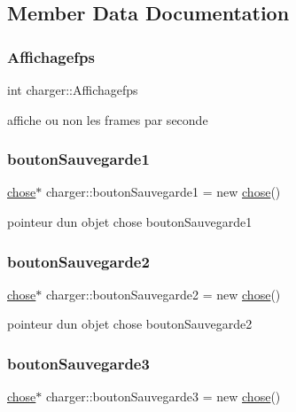 \subsection{Member Data Documentation}
\mbox{\label{classcharger_ad6193b2bdf5b389a40406961cd59090f}} 
\subsubsection{\texorpdfstring{Affichagefps}{Affichagefps}}
{\footnotesize\ttfamily int charger\+::\+Affichagefps}

affiche ou non les frames par seconde \mbox{\label{classcharger_af6c0ada98ee21a7ef16d3ff8aa9d35d6}} 
\subsubsection{\texorpdfstring{bouton\+Sauvegarde1}{boutonSauvegarde1}}
{\footnotesize\ttfamily \mbox{\hyperlink{classchose}{chose}}$\ast$ charger\+::bouton\+Sauvegarde1 = new \mbox{\hyperlink{classchose}{chose}}()}

pointeur d\textquotesingle{}un objet chose bouton\+Sauvegarde1 \mbox{\label{classcharger_a4e0387e8d34801e59fc10eb9063f0379}} 
\subsubsection{\texorpdfstring{bouton\+Sauvegarde2}{boutonSauvegarde2}}
{\footnotesize\ttfamily \mbox{\hyperlink{classchose}{chose}}$\ast$ charger\+::bouton\+Sauvegarde2 = new \mbox{\hyperlink{classchose}{chose}}()}

pointeur d\textquotesingle{}un objet chose bouton\+Sauvegarde2 \mbox{\label{classcharger_a8ac0d4c842e02190e452892932107887}} 
\subsubsection{\texorpdfstring{bouton\+Sauvegarde3}{boutonSauvegarde3}}
{\footnotesize\ttfamily \mbox{\hyperlink{classchose}{chose}}$\ast$ charger\+::bouton\+Sauvegarde3 = new \mbox{\hyperlink{classchose}{chose}}()}

